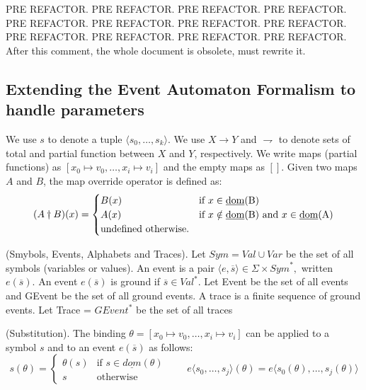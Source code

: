 			
		
		PRE REFACTOR. PRE REFACTOR. PRE REFACTOR. PRE REFACTOR. PRE REFACTOR. PRE REFACTOR. PRE REFACTOR. PRE REFACTOR. PRE REFACTOR. PRE REFACTOR. PRE REFACTOR. PRE REFACTOR. 
		After this comment, the whole document is obsolete, must rewrite it.

			

		

		

			
		\subsection{Extending the Event Automaton Formalism to handle parameters}
			
		
			
			We use $s$ to denote a tuple $\langle s_0,\dots,s_k \rangle$. We use $X \rightarrow Y$ and $\rightharpoondown$ to denote sets of total and partial function between
			$X$ and $Y$, respectively. We write maps (partial functions) as $[x_0 \mapsto v_0,\dots,x_i \mapsto v_i]$ and the empty maps as $[]$. Given two maps $A$ and $B$,
			the map override operator is defined as:
				\[
				 (A \dagger B)(x) = 
				  \begin{cases} 
				   B(x) & \text{if } x \in \text{\underline{dom}(B)} \\
				   A(x) & \text{if } x \notin \text{\underline{dom}(B)} \text{ and } x \in \text{\underline{dom}(A)} \\
				   \text{undefined otherwise.}
				  \end{cases}
				\]
 			
			\begin{dfn}
				(Smybols, Events, Alphabets and Traces).
				Let $\mathit{Sym} = \mathit{Val} \cup \mathit{Var}$ be the set of all symbols (variables or values).
				An event is a pair $\langle e, \overline{s} \rangle \in \Sigma \times \mathit{Sym}^\ast,$ written $e(\overline{s})$.
				An event $e(\overline{s})$ is ground if $\overline{s} \in \mathit{Val}^\ast$.
				Let Event be the set of all events and GEvent be the set of all ground events.
				A trace is a finite sequence of ground events.
				Let Trace = $GEvent^\ast$ be the set of all traces
			\end{dfn}
			
			\begin{dfn}
				(Substitution).
				The binding $\theta = [x_0 \mapsto v_0, \dots, x_i \mapsto v_i]$ can be applied to a symbol $s$ and to an event
				$e(\overline{s})$ as follows: 
				\[
				 s(\theta) = 
				  \begin{cases} 
				   \theta(s) & \text{if } s \in \underline{dom}(\theta) \\
				   s & \text{otherwise}
				  \end{cases}
				  \qquad e \langle s_0,\ldots,s_j \rangle (\theta) = e \langle s_0(\theta),\ldots,s_j(\theta) \rangle
				\]
			\end{dfn}
			

